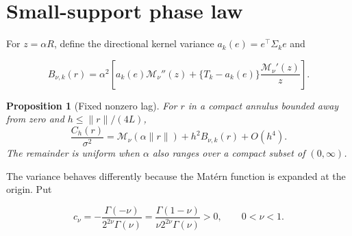 \documentclass[11pt]{article}
\newtheorem{proposition}{Proposition}
\theoremstyle{remark}
\newcommand{\Matern}{\mathcal M}
\begin{document}
\section{Small-support phase law}

For \(z=\alpha R\), define the directional kernel variance
\(a_k(e)=e^\top\Sigma_k e\) and

\begin{equation}
  B_{\nu,k}(r)
  =\alpha^2\left[
    a_k(e)\Matern_\nu''(z)
    +\{T_k-a_k(e)\}\frac{\Matern_\nu'(z)}{z}
  \right].
  \label{eq:B-definition}
\end{equation}

\begin{proposition}[Fixed nonzero lag]
For \(r\) in a compact annulus bounded away from zero and
\(h\leq \lVert r\rVert/(4L)\),
\begin{equation}
  \frac{C_h(r)}{\sigma^2}
  =\Matern_\nu(\alpha\lVert r\rVert)
  +h^2 B_{\nu,k}(r)+O(h^4).
  \label{eq:fixed-lag-expansion}
\end{equation}
The remainder is uniform when \(\alpha\) also ranges over a compact subset of
\((0,\infty)\).
\end{proposition}

The variance behaves differently because the Mat\'ern function is expanded at
the origin.  Put

\begin{equation}
  c_\nu
  =-\frac{\Gamma(-\nu)}{2^{2\nu}\Gamma(\nu)}
  =\frac{\Gamma(1-\nu)}{\nu 2^{2\nu}\Gamma(\nu)}>0,
  \qquad 0<\nu<1.
\end{equation}
\end{document}
